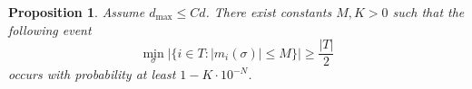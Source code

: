 \documentclass[letterpaper,11pt,reqno]{amsart}
\newtheorem{prop}[thm]{Proposition}
\renewcommand{\le}{\leqslant}
\renewcommand{\ge}{\geqslant}
\newcommand{\norm}[1]{\left\Vert#1\right\Vert}
\newcommand{\abs}[1]{\left\vert#1\right\vert}
\newcommand{\ie}{\emph{i.e.,}}
\newcommand{\mv}[1]{\boldsymbol{#1}}\newcommand{\mvinfty}{\boldsymbol{\infty}}\newcommand{\mvzero}{\boldsymbol{0}}
\newcommand{\mvm}{{m}}
\newcommand{\mvgs}{{\sigma}}
\newcommand{\bP}{\mathbb{P}}\newcommand{\bQ}{\mathbb{Q}}\newcommand{\bR}{\mathbb{R}}
\DeclareMathOperator{\sech}{sech}
\begin{document}
\begin{prop}\label{prop:mi-bound}
    Assume $d_{\max} \le C d$. There exist constants $M, K>0$  such that the following event 
   \[  \min_{\mvgs} |\{ i \in T : |m_i(\mvgs)| \le M \}| \ge \frac{|T|}{2}\]
   occurs with probability at least $1 - K \cdot 10^{-N}$.
\end{prop}
\end{document}
